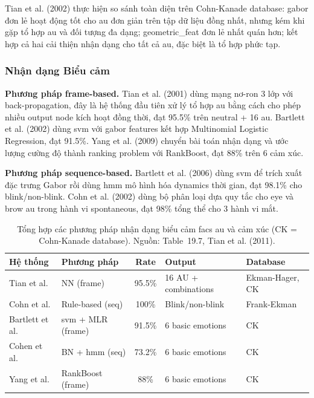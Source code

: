 \documentclass[12pt,a4paper]{article}
\let\oldtextbf\textbf
\renewcommand{\textbf}[1]{\oldtextbf{\textcolor{hcmublue}{#1}}}
\begin{document}
Tian et al. (2002) thực hiện so sánh toàn diện trên Cohn-Kanade database: \gls{gabor} đơn lẻ hoạt động tốt cho \gls{au} đơn giản trên tập dữ liệu đồng nhất, nhưng kém khi gặp tổ hợp \gls{au} và đối tượng đa dạng; \gls{geometric_feat} đơn lẻ nhất quán hơn; kết hợp cả hai cải thiện nhận dạng cho tất cả \gls{au}, đặc biệt là tổ hợp phức tạp.

\subsubsection{Nhận dạng Biểu cảm}

\textbf{Phương pháp frame-based.}
Tian et al. (2001) dùng mạng nơ-ron 3 lớp với back-propagation, đây là hệ thống đầu tiên xử lý tổ hợp \gls{au} bằng cách cho phép nhiều output node kích hoạt đồng thời, đạt 95.5\% trên neutral + 16 \gls{au}. Bartlett et al. (2002) dùng \gls{svm} với \gls{gabor} features kết hợp Multinomial Logistic Regression, đạt 91.5\%. Yang et al. (2009) chuyển bài toán nhận dạng và ước lượng cường độ thành ranking problem với RankBoost, đạt 88\% trên 6 cảm xúc.

\textbf{Phương pháp sequence-based.}
Bartlett et al. (2006) dùng \gls{svm} để trích xuất đặc trưng Gabor rồi dùng \gls{hmm} mô hình hóa dynamics thời gian, đạt 98.1\% cho blink/non-blink. Cohn et al. (2002) dùng bộ phân loại dựa quy tắc cho eye và brow \gls{au} trong hành vi spontaneous, đạt 98\% tổng thể cho 3 hành vi mắt.

\begin{table}[H]
\centering
\small
\begin{tabular}{|l|l|c|l|l|}
\hline
\textbf{Hệ thống} & \textbf{Phương pháp} & \textbf{Rate} & \textbf{Output} & \textbf{Database} \\ \hline
Tian et al. & NN (frame) & 95.5\% & 16 AU + combinations & Ekman-Hager, CK \\ \hline
Cohn et al. & Rule-based (seq) & 100\% & Blink/non-blink & Frank-Ekman \\ \hline
Bartlett et al. & \gls{svm} + MLR (frame) & 91.5\% & 6 basic emotions & CK \\ \hline
Cohen et al. & BN + \gls{hmm} (seq) & 73.2\% & 6 basic emotions & CK \\ \hline
Yang et al. & RankBoost (frame) & 88\% & 6 basic emotions & CK \\ \hline
\end{tabular}
\caption{Tổng hợp các phương pháp nhận dạng biểu cảm \gls{facs} \gls{au} và cảm xúc (CK = Cohn-Kanade database). Nguồn: Table~19.7, Tian et al. (2011).}
\label{tab:recognition_methods}
\end{table}
\end{document}
